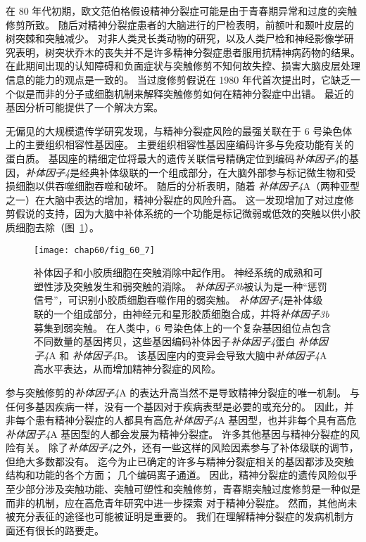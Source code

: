 在 80 年代初期，欧文范伯格假设精神分裂症可能是由于青春期异常和过度的突触修剪所致。
随后对精神分裂症患者的大脑进行的尸检表明，前额叶和颞叶皮层的树突棘和突触减少。
对非人类灵长类动物的研究，以及人类尸检和神经影像学研究表明，树突状乔木的丧失并不是许多精神分裂症患者服用抗精神病药物的结果。
在此期间出现的认知障碍和负面症状与突触修剪不知何故失控、损害大脑皮层处理信息的能力的观点是一致的。
当过度修剪假说在 1980 年代首次提出时，它缺乏一个似是而非的分子或细胞机制来解释突触修剪如何在精神分裂症中出错。
最近的基因分析可能提供了一个解决方案。


无偏见的大规模遗传学研究发现，与精神分裂症风险的最强关联在于 6 号染色体上的主要组织相容性基因座。
主要组织相容性基因座编码许多与免疫功能有关的蛋白质。
基因座的精细定位将最大的遗传关联信号精确定位到编码\textit{补体因子4}的基因，\textit{补体因子4}是经典补体级联的一个组成部分，在大脑外部参与标记微生物和受损细胞以供吞噬细胞吞噬和破坏。
随后的分析表明，随着 \textit{补体因子4}A（两种亚型之一）在大脑中表达的增加，精神分裂症的风险升高。
这一发现增加了对过度修剪假说的支持，因为大脑中补体系统的一个功能是标记微弱或低效的突触以供小胶质细胞去除（图~\ref{fig:60_7}）。


\begin{figure}[htbp]
	\centering
	\texttt{[image: chap60/fig\_60\_7]}
	\caption{补体因子和小胶质细胞在突触消除中起作用。
		神经系统的成熟和可塑性涉及突触发生和弱突触的消除。
		\textit{补体因子3b}被认为是一种“惩罚信号”，可识别小胶质细胞吞噬作用的弱突触。
		\textit{补体因子4}是补体级联的一个组成部分，由神经元和星形胶质细胞合成，并将\textit{补体因子3b}募集到弱突触。
		在人类中，6 号染色体上的一个复杂基因组位点包含不同数量的基因拷贝，这些基因编码补体因子\textit{补体因子4}蛋白 \textit{补体因子4}A 和 \textit{补体因子4}B。
		该基因座内的变异会导致大脑中\textit{补体因子4}A 高水平表达，从而增加精神分裂症的风险。}
	\label{fig:60_7}
\end{figure}


参与突触修剪的\textit{补体因子4}A 的表达升高当然不是导致精神分裂症的唯一机制。
与任何多基因疾病一样，没有一个基因对于疾病表型是必要的或充分的。
因此，并非每个患有精神分裂症的人都具有高危\textit{补体因子4}A 基因型，也并非每个具有高危\textit{补体因子4}A 基因型的人都会发展为精神分裂症。 许多其他基因与精神分裂症的风险有关。
除了\textit{补体因子4}之外，还有一些这样的风险因素参与了补体级联的调节，但绝大多数都没有。
迄今为止已确定的许多与精神分裂症相关的基因都涉及突触结构和功能的各个方面；
几个编码离子通道。
因此，精神分裂症的遗传风险似乎至少部分涉及突触功能、突触可塑性和突触修剪，青春期突触过度修剪是一种似是而非的机制，应在高危青年研究中进一步探索 对于精神分裂症。
然而，其他尚未被充分表征的途径也可能被证明是重要的。
我们在理解精神分裂症的发病机制方面还有很长的路要走。



